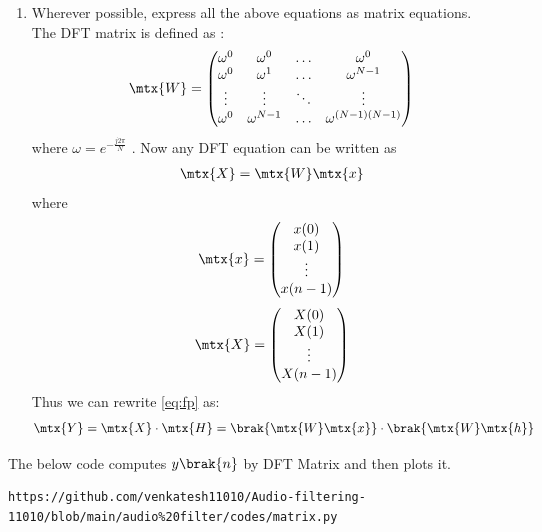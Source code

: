 \documentclass[journal,12pt,twocolumn]{IEEEtran}
\theoremstyle{remark}
\begin{document}
\begin{enumerate}[label=\thesection.\arabic*]
\item Wherever possible, express all the above equations as matrix equations.\\
\solution The DFT matrix is defined as : 
\begin{align}
	\mtx{W} = 
	\begin{pmatrix}
		\omega^0 & \omega^0 & \ldots & \omega^0 \\
		\omega^0 & \omega^1 & \ldots & \omega^{N - 1} \\
		\vdots & \vdots & \ddots & \vdots \\
		\omega^0 & \omega^{N - 1} & \ldots & \omega^{(N -1)(N - 1)}
	\end{pmatrix}
\end{align}
where $\omega=e^{-\frac{j2\pi}{N}}$ . Now any DFT equation can be written as
\begin{align}
    \mtx{X} = \mtx{W}\mtx{x}
\end{align}
\noindent where
\begin{align}
	\mtx{x} = 
	\begin{pmatrix}
		x(0) \\ x(1) \\ \vdots \\ x(n - 1)
	\end{pmatrix}
\end{align}
\begin{align}
	\mtx{X} = 
	\begin{pmatrix}
		X(0) \\ X(1) \\ \vdots \\ X(n - 1)
	\end{pmatrix}
\end{align}
Thus we can rewrite  \eqref{eq:fp} as:
\begin{align}
	\mtx{Y} = \mtx{X}\cdot\mtx{H} = \brak{\mtx{W}\mtx{x}}\cdot\brak{\mtx{W}\mtx{h}}
\end{align}
\end{enumerate}
The below code computes $y\brak{n}$ by DFT Matrix and then plots it.
\begin{lstlisting}
https://github.com/venkatesh11010/Audio-filtering-11010/blob/main/audio%20filter/codes/matrix.py
\end{lstlisting}
\end{document}
